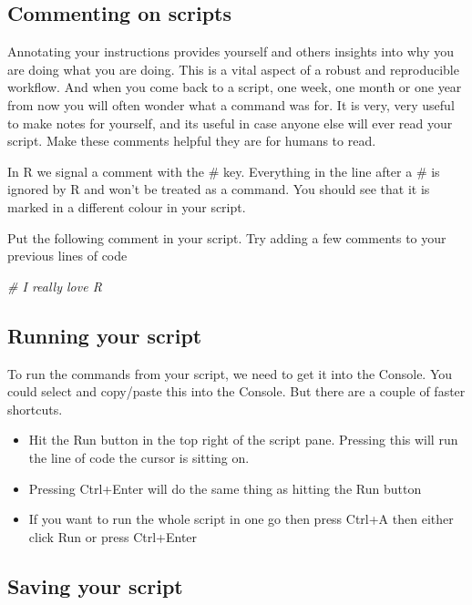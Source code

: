 \documentclass[
]{book}
\newenvironment{Shaded}{\begin{snugshade}}{\end{snugshade}}
\newcommand{\CommentTok}[1]{\textcolor[rgb]{0.56,0.35,0.01}{\textit{#1}}}
\begin{document}
\hypertarget{commenting-on-scripts}{%
\subsection{Commenting on scripts}\label{commenting-on-scripts}}

Annotating your instructions provides yourself and others insights into why you are doing what you are doing. This is a vital aspect of a robust and reproducible workflow. And when you come back to a script, one week, one month or one year from now you will often wonder what a command was for. It is very, very useful to make notes for yourself, and its useful in case anyone else will ever read your script. Make these comments helpful they are for humans to read.

In R we signal a comment with the \# key. Everything in the line after a \# is ignored by R and won't be treated as a command. You should see that it is marked in a different colour in your script.

Put the following comment in your script. Try adding a few comments to your previous lines of code

\begin{Shaded}
\begin{Highlighting}[]
\CommentTok{\# I really love R}
\end{Highlighting}
\end{Shaded}

\hypertarget{running-your-script}{%
\subsection{Running your script}\label{running-your-script}}

To run the commands from your script, we need to get it into the Console. You could select and copy/paste this into the Console. But there are a couple of faster shortcuts.

\begin{itemize}
\item
  Hit the Run button in the top right of the script pane. Pressing this will run the line of code the cursor is sitting on.
\item
  Pressing Ctrl+Enter will do the same thing as hitting the Run button
\item
  If you want to run the whole script in one go then press Ctrl+A then either click Run or press Ctrl+Enter
\end{itemize}

\hypertarget{saving-your-script}{%
\subsection{Saving your script}\label{saving-your-script}}
\end{document}

